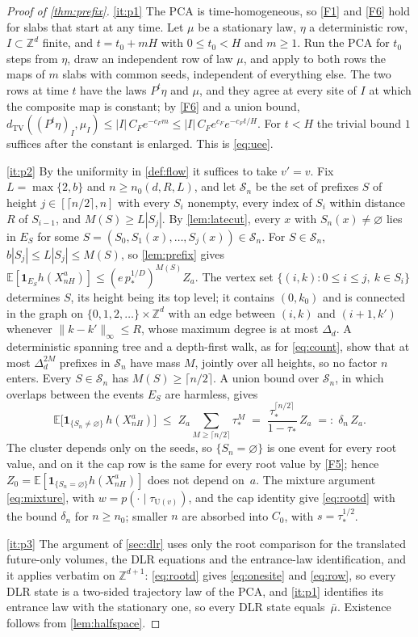 \documentclass[11pt]{article}
\theoremstyle{plain}
\theoremstyle{definition}
\theoremstyle{remark}
\newcommand{\Z}{\mathbb{Z}}
\newcommand{\E}{\mathbb{E}}
\newcommand{\dtv}{d_{\mathrm{TV}}}
\newcommand{\ba}{\bar{\mu}}
\newcommand{\Ue}{\mathrm{U}}
\begin{document}
\begin{proof}[Proof of \cref{thm:prefix}]
\ref{it:p1} The PCA is time-homogeneous, so \ref{F1} and \ref{F6} hold for slabs that start at any time. Let $\mu$ be a stationary law, $\eta$ a deterministic row, $I\subset\Z^d$ finite, and $t=t_0+mH$ with $0\le t_0<H$ and $m\ge1$. Run the PCA for $t_0$ steps from $\eta$, draw an independent row of law $\mu$, and apply to both rows the maps of $m$ slabs with common seeds, independent of everything else. The two rows at time $t$ have the laws $P^t\eta$ and $\mu$, and they agree at every site of $I$ at which the composite map is constant; by \ref{F6} and a union bound, $\dtv((P^t\eta)_I,\mu_I)\le|I|\,C_Fe^{-c_Fm}\le|I|\,C_Fe^{c_F}e^{-c_Ft/H}$. For $t<H$ the trivial bound $1$ suffices after the constant is enlarged. This is \eqref{eq:uee}.

\ref{it:p2} By the uniformity in \cref{def:flow} it suffices to take $v'=v$. Fix $L=\max\{2,b\}$ and $n\ge n_0(d,R,L)$, and let $\mathcal S_n$ be the set of prefixes $S$ of height $j\in[\lceil n/2\rceil,n]$ with every $S_i$ nonempty, every index of $S_i$ within distance $R$ of $S_{i-1}$, and $M(S)\ge L|S_j|$. By \cref{lem:latecut}, every $x$ with $S_n(x)\neq\varnothing$ lies in $E_S$ for some $S=(S_0,S_1(x),\dots,S_j(x))\in\mathcal S_n$. For $S\in\mathcal S_n$, $b|S_j|\le L|S_j|\le M(S)$, so \cref{lem:prefix} gives $\E[\mathbf 1_{E_S}h(X^a_{nH})]\le(e\,p_*^{1/D})^{M(S)}Z_a$. The vertex set $\{(i,k):0\le i\le j,\ k\in S_i\}$ determines $S$, its height being its top level; it contains $(0,k_0)$ and is connected in the graph on $\{0,1,2,\dots\}\times\Z^d$ with an edge between $(i,k)$ and $(i+1,k')$ whenever $\|k-k'\|_\infty\le R$, whose maximum degree is at most $\Delta_d$. A deterministic spanning tree and a depth-first walk, as for \eqref{eq:count}, show that at most $\Delta_d^{2M}$ prefixes in $\mathcal S_n$ have mass $M$, jointly over all heights, so no factor $n$ enters. Every $S\in\mathcal S_n$ has $M(S)\ge\lceil n/2\rceil$. A union bound over $\mathcal S_n$, in which overlaps between the events $E_S$ are harmless, gives
\[
\E\bigl[\mathbf 1_{\{S_n\neq\varnothing\}}\,h(X^a_{nH})\bigr]\;\le\;Z_a\sum_{M\ge\lceil n/2\rceil}\tau_*^M\;=\;\frac{\tau_*^{\lceil n/2\rceil}}{1-\tau_*}\,Z_a\;=:\;\delta_n\,Z_a.
\]
The cluster depends only on the seeds, so $\{S_n=\varnothing\}$ is one event for every root value, and on it the cap row is the same for every root value by \ref{F5}; hence $Z_0=\E[\mathbf 1_{\{S_n=\varnothing\}}h(X^a_{nH})]$ does not depend on~$a$. The mixture argument \eqref{eq:mixture}, with $w=p(\cdot\mid\tau_{\Ue(v)})$, and the cap identity give \eqref{eq:rootd} with the bound $\delta_n$ for $n\ge n_0$; smaller $n$ are absorbed into $C_0$, with $s=\tau_*^{1/2}$.

\ref{it:p3} The argument of \cref{sec:dlr} uses only the root comparison for the translated future-only volumes, the DLR equations and the entrance-law identification, and it applies verbatim on $\Z^{d+1}$: \eqref{eq:rootd} gives \eqref{eq:onesite} and \eqref{eq:row}, so every DLR state is a two-sided trajectory law of the PCA, and \ref{it:p1} identifies its entrance law with the stationary one, so every DLR state equals~$\ba$. Existence follows from \cref{lem:halfspace}.
\end{proof}
\end{document}

